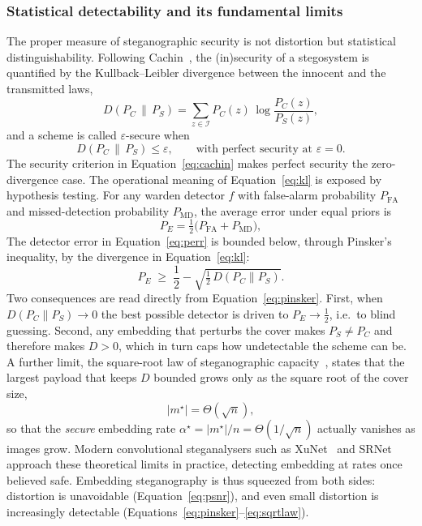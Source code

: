 \documentclass[10pt,a4paper]{article}
\theoremstyle{definition}
\begin{document}
\subsubsection{Statistical detectability and its fundamental limits}\label{sec:security}
The proper measure of steganographic security is not distortion but statistical
distinguishability. Following Cachin~\cite{cachin}, the (in)security of a stegosystem is
quantified by the Kullback--Leibler divergence between the innocent and the
transmitted laws,
\begin{equation}
  D\!\left(P_C \,\|\, P_S\right)=\sum_{z\in\mathcal{I}} P_C(z)\,
        \log\frac{P_C(z)}{P_S(z)} ,
  \label{eq:kl}
\end{equation}
and a scheme is called $\varepsilon$-secure when
\begin{equation}
  D\!\left(P_C \,\|\, P_S\right)\le\varepsilon,
  \qquad\text{with perfect security at } \varepsilon=0 .
  \label{eq:cachin}
\end{equation}
The security criterion in Equation~\eqref{eq:cachin} makes perfect security the zero-divergence
case. The operational meaning of Equation~\eqref{eq:kl} is exposed by hypothesis testing. For any
warden detector $f$ with false-alarm probability $P_{\mathrm{FA}}$ and
missed-detection probability $P_{\mathrm{MD}}$, the average error under equal
priors is
\begin{equation}
  P_E=\tfrac{1}{2}\bigl(P_{\mathrm{FA}}+P_{\mathrm{MD}}\bigr),
  \label{eq:perr}
\end{equation}
The detector error in Equation~\eqref{eq:perr} is bounded below, through Pinsker's inequality,
by the divergence
in Equation~\eqref{eq:kl}:
\begin{equation}
  P_E \;\ge\; \frac{1}{2}-\sqrt{\tfrac{1}{2}\,D\!\left(P_C\|P_S\right)} .
  \label{eq:pinsker}
\end{equation}
Two consequences are read directly from Equation~\eqref{eq:pinsker}. First, when
$D\!\left(P_C\|P_S\right)\to 0$ the best possible detector is driven to
$P_E\to\tfrac12$, i.e.\ to blind guessing. Second, any embedding that perturbs the
cover makes $P_S\neq P_C$ and therefore makes $D>0$, which in turn caps how
undetectable the scheme can be. A further limit, the square-root law of
steganographic capacity~\cite{kerSqrt}, states that the largest payload that keeps $D$ bounded
grows only as the square root of the cover size,
\begin{equation}
  |m^\star| = \Theta\!\left(\sqrt{n}\right),
  \label{eq:sqrtlaw}
\end{equation}
so that the \emph{secure} embedding rate $\alpha^\star=|m^\star|/n=\Theta(1/\sqrt
n)$ actually vanishes as images grow. Modern convolutional steganalysers such as
XuNet~\cite{xu2016} and SRNet~\cite{boroumand2019} approach these theoretical
limits in practice, detecting embedding at rates once believed safe. Embedding
steganography is thus squeezed from both sides: distortion is unavoidable
(Equation~\eqref{eq:psnr}), and even small distortion is increasingly detectable
(Equations~\eqref{eq:pinsker}--\eqref{eq:sqrtlaw}).
\end{document}
